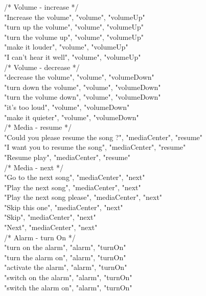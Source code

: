 \documentclass[twoside]{supsistudent}
\begin{document}
\begin{appendices}
        /*
        Volume - increase
         */\\
        "Increase the volume", "volume", "volumeUp"\\
        "turn up the volume", "volume", "volumeUp"\\
        "turn the volume up", "volume", "volumeUp"\\
        "make it louder", "volume", "volumeUp"\\
        "I can’t hear it well", "volume", "volumeUp"\\
        /*
        Volume - decrease
         */\\
        "decrease the volume", "volume", "volumeDown"\\
        "turn down the volume", "volume", "volumeDown"\\
        "turn the volume down", "volume", "volumeDown"\\
        "it’s too loud", "volume", "volumeDown"\\
        "make it quieter", "volume", "volumeDown"\\
        /*
        Media - resume
         */\\
        "Could you please resume the song ?", "mediaCenter", "resume"\\
        "I want you to resume the song", "mediaCenter", "resume"\\
        "Resume play", "mediaCenter", "resume"\\
        /*
        Media - next
         */\\
        "Go to the next song", "mediaCenter", "next"\\
        "Play the next song", "mediaCenter", "next"\\
        "Play the next song please", "mediaCenter", "next"\\
        "Skip this one", "mediaCenter", "next"\\
        "Skip", "mediaCenter", "next"\\
        "Next", "mediaCenter", "next"\\
        /*
        Alarm - turn On
         */\\
        "turn on the alarm", "alarm", "turnOn"\\
        "turn the alarm on", "alarm", "turnOn"\\
        "activate the alarm", "alarm", "turnOn"\\
        "switch on the alarm", "alarm", "turnOn"\\
        "switch the alarm on", "alarm", "turnOn"\\

\end{appendices}
\end{document}
